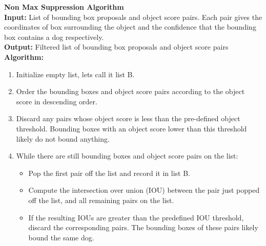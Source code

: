 \documentclass{article}
\begin{document}
\begin{minipage}{1\textwidth}%
	\noindent \textbf{Non Max Suppression Algorithm} \\

  \noindent \textbf{Input:} List of bounding box proposals and object score pairs.  Each pair gives the coordinates of box surrounding the object and the confidence that the bounding box contains a dog respectively. \\
  
  \noindent \textbf{Output:} Filtered list of bounding box proposals and object score pairs \\
  
  \noindent \textbf{Algorithm:} \\
\end{minipage}%

\begin{enumerate}

  \item Initialize empty list, lets call it list B.

  \item Order the bounding boxes and object score pairs according to the object score in descending order.
  
  \item Discard any pairs whose object score is less than the pre-defined object threshold.  Bounding boxes with an object score lower than this threshold likely do not bound anything.
  
  \item While there are still bounding boxes and object score pairs on the list:
        \begin{itemize}
             \item Pop the first pair off the list and record it in list B.
            
             \item Compute the intersection over union (IOU) between the pair just popped off the list, and all remaining pairs on the list.
             \item If the resulting IOUs are greater than the predefined IOU threshold, discard the corresponding pairs.  The bounding boxes of these pairs likely bound the same dog.
        \end{itemize}
\end{enumerate}
\end{document}

